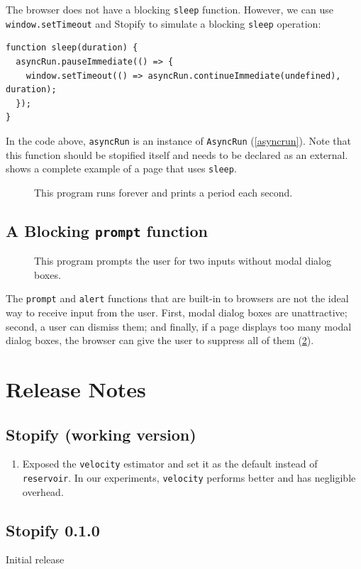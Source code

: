\documentclass[10pt]{book}
\begin{document}
The browser does not have a blocking \lstinline|sleep| function.
However, we can use \lstinline|window.setTimeout| and Stopify to simulate
a blocking \lstinline|sleep| operation:
\begin{lstlisting}
function sleep(duration) {
  asyncRun.pauseImmediate(() => {
    window.setTimeout(() => asyncRun.continueImmediate(undefined), duration);
  });
}
\end{lstlisting}

In the code above, \lstinline|asyncRun| is an instance of \lstinline|AsyncRun|
(\cref{asyncrun}). Note that this function should be stopified itself and
needs to be declared as an external.  shows a complete example
of a page that uses \lstinline|sleep|.

\begin{figure}

\caption{This program runs forever and prints a period each second.}
\label{sleep-complete}
\end{figure}

\section{A Blocking \texttt{prompt} function}

\begin{figure}

\caption{This program prompts the user for two inputs without modal dialog boxes.}
\label{prompt-complete}
\end{figure}

The \lstinline|prompt| and \lstinline|alert| functions that are built-in to
browsers are not the ideal way to receive input from the user. First, modal
dialog boxes are unattractive; second, a user can dismiss them; and finally, if
a page displays too many modal dialog boxes, the browser can give the user to
suppress all of them (\cref{prompt-complete}).

\appendix

\chapter{Release Notes}

\section{Stopify (working version)}

\begin{enumerate}

  \item Exposed the \texttt{velocity} estimator and set it as the default
  instead of \texttt{reservoir}. In our experiments, \texttt{velocity} performs
  better and has negligible overhead.

\end{enumerate}

\section{Stopify 0.1.0}

Initial release
\end{document}
